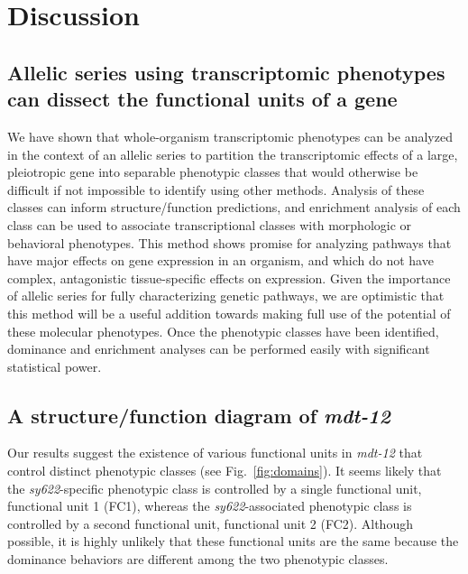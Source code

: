 \documentclass[10pt, twocolumn]{article}
\newcommand{\cel}{\emph{C.~elegans}}
\newcommand{\gene}[1]{\mbox{\emph{#1}}}
\newcommand{\protein}[1]{\mbox{\uppercase{#1}}}
\newcommand{\dpy}{\gene{mdt-12}}
\begin{document}
\section*{Discussion}
\label{sec:conclusions}
\subsection*{Allelic series using transcriptomic phenotypes can dissect the
             functional units of a gene}
We have shown that whole-organism transcriptomic phenotypes can be analyzed in
the context of an allelic series to partition the transcriptomic effects of a
large, pleiotropic gene into separable phenotypic classes that would otherwise
be difficult if not impossible to identify using other methods. Analysis of
these classes can inform structure/function predictions, and enrichment analysis
of each class can be used to associate transcriptional classes with morphologic
or behavioral phenotypes. This method shows promise for analyzing pathways that
have major effects on gene expression in an organism, and which do not have
complex, antagonistic tissue-specific effects on expression. Given the
importance of allelic series for fully characterizing genetic pathways, we are
optimistic that this method will be a useful addition towards making full use of
the potential of these molecular phenotypes. Once the phenotypic classes have
been identified, dominance and enrichment analyses can be performed easily with
significant statistical power.

\subsection*{A structure/function diagram of \dpy{}}
Our results suggest the existence of various functional units in \dpy{}
that control distinct phenotypic classes (see Fig.~\ref{fig:domains}). It seems
likely that the \emph{sy622}-specific phenotypic class is controlled by a single
functional unit, functional unit 1 (FC1), whereas the \emph{sy622}-associated
phenotypic class is controlled by a second functional unit, functional unit 2
(FC2). Although possible, it is highly unlikely that these functional units are
the same because the dominance behaviors are different among the two phenotypic
classes.
\end{document}
